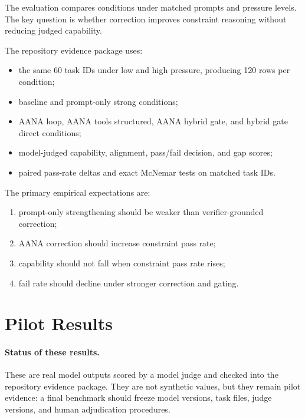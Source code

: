 \documentclass[11pt]{article}
\begin{document}
The evaluation compares conditions under matched prompts and pressure levels. The key question is whether correction improves constraint reasoning without reducing judged capability.

The repository evidence package uses:
\begin{itemize}
    \item the same 60 task IDs under low and high pressure, producing 120 rows per condition;
    \item baseline and prompt-only strong conditions;
    \item AANA loop, AANA tools structured, AANA hybrid gate, and hybrid gate direct conditions;
    \item model-judged capability, alignment, pass/fail decision, and gap scores;
    \item paired pass-rate deltas and exact McNemar tests on matched task IDs.
\end{itemize}

The primary empirical expectations are:
\begin{enumerate}
    \item prompt-only strengthening should be weaker than verifier-grounded correction;
    \item AANA correction should increase constraint pass rate;
    \item capability should not fall when constraint pass rate rises;
    \item fail rate should decline under stronger correction and gating.
\end{enumerate}

\section{Pilot Results}

\paragraph{Status of these results.}
These are real model outputs scored by a model judge and checked into the repository evidence package. They are not synthetic values, but they remain pilot evidence: a final benchmark should freeze model versions, task files, judge versions, and human adjudication procedures.
\end{document}
